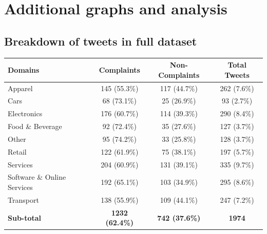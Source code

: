 \chapter{Additional graphs and analysis}

\section{Breakdown of tweets in full dataset}
\label{sec: apdxa_fulldataset}
\begin{table}[ht]
    \captionsetup{font=small}
    \centering
    \begin{tabularx}{\textwidth}{|X|c|c|c|}
        \hline
        \rowcolor[gray]{0.7}
        \textbf{Domains}            & \textbf{Complaints}   & \textbf{Non-Complaints} & \textbf{Total Tweets} \\
        \hline
        Apparel                     & 145 \small{(55.3\%)}  & 117 \small{(44.7\%)}    & 262 \small{(7.6\%)}   \\
        \hline
        Cars                        & 68 \small{(73.1\%)}   & 25 \small{(26.9\%)}     & 93 \small{(2.7\%)}    \\
        \hline
        Electronics                 & 176 \small{(60.7\%)}  & 114 \small{(39.3\%)}    & 290 \small{(8.4\%)}   \\
        \hline
        Food \& Beverage            & 92 \small{(72.4\%)}   & 35 \small{(27.6\%)}     & 127 \small{(3.7\%)}   \\
        \hline
        Other                       & 95 \small{(74.2\%)}   & 33 \small{(25.8\%)}     & 128 \small{(3.7\%)}   \\
        \hline
        Retail                      & 122 \small{(61.9\%)}  & 75 \small{(38.1\%)}     & 197 \small{(5.7\%)}   \\
        \hline
        Services                    & 204 \small{(60.9\%)}  & 131 \small{(39.1\%)}    & 335 \small{(9.7\%)}   \\
        \hline
        Software \& Online Services & 192 \small{(65.1\%)}  & 103 \small{(34.9\%)}    & 295 \small{(8.6\%)}   \\
        \hline
        Transport                   & 138 \small{(55.9\%)}  & 109 \small{(44.1\%)}    & 247 \small{(7.2\%)}   \\
        \hline
        \rowcolor[gray]{0.9}
        \textbf{Sub-total}          & \textbf{1232 \small{(62.4\%)}} & \textbf{742 \small{(37.6\%)}} & \textbf{1974}  \\
        \hline
        \hline

\end{tabularx}
\end{table}
